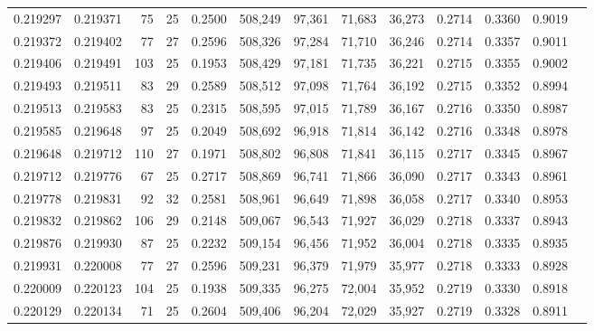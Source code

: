 \begin{tabular}{rrrrrrrrrrrrr}
0.219297 & 0.219371 &  75 &  25 &                                     0.2500 & 508,249 &  97,361 &  71,683 &  36,273 & 0.2714 & 0.3360 & 0.9019 \\
0.219372 & 0.219402 &  77 &  27 &                                     0.2596 & 508,326 &  97,284 &  71,710 &  36,246 & 0.2714 & 0.3357 & 0.9011 \\
0.219406 & 0.219491 & 103 &  25 &                                     0.1953 & 508,429 &  97,181 &  71,735 &  36,221 & 0.2715 & 0.3355 & 0.9002 \\
0.219493 & 0.219511 &  83 &  29 &                                     0.2589 & 508,512 &  97,098 &  71,764 &  36,192 & 0.2715 & 0.3352 & 0.8994 \\
0.219513 & 0.219583 &  83 &  25 &                                     0.2315 & 508,595 &  97,015 &  71,789 &  36,167 & 0.2716 & 0.3350 & 0.8987 \\
0.219585 & 0.219648 &  97 &  25 &                                     0.2049 & 508,692 &  96,918 &  71,814 &  36,142 & 0.2716 & 0.3348 & 0.8978 \\
0.219648 & 0.219712 & 110 &  27 &                                     0.1971 & 508,802 &  96,808 &  71,841 &  36,115 & 0.2717 & 0.3345 & 0.8967 \\
0.219712 & 0.219776 &  67 &  25 &                                     0.2717 & 508,869 &  96,741 &  71,866 &  36,090 & 0.2717 & 0.3343 & 0.8961 \\
0.219778 & 0.219831 &  92 &  32 &                                     0.2581 & 508,961 &  96,649 &  71,898 &  36,058 & 0.2717 & 0.3340 & 0.8953 \\
0.219832 & 0.219862 & 106 &  29 &                                     0.2148 & 509,067 &  96,543 &  71,927 &  36,029 & 0.2718 & 0.3337 & 0.8943 \\
0.219876 & 0.219930 &  87 &  25 &                                     0.2232 & 509,154 &  96,456 &  71,952 &  36,004 & 0.2718 & 0.3335 & 0.8935 \\
0.219931 & 0.220008 &  77 &  27 &                                     0.2596 & 509,231 &  96,379 &  71,979 &  35,977 & 0.2718 & 0.3333 & 0.8928 \\
0.220009 & 0.220123 & 104 &  25 &                                     0.1938 & 509,335 &  96,275 &  72,004 &  35,952 & 0.2719 & 0.3330 & 0.8918 \\
0.220129 & 0.220134 &  71 &  25 &                                     0.2604 & 509,406 &  96,204 &  72,029 &  35,927 & 0.2719 & 0.3328 & 0.8911 \\

\end{tabular}
